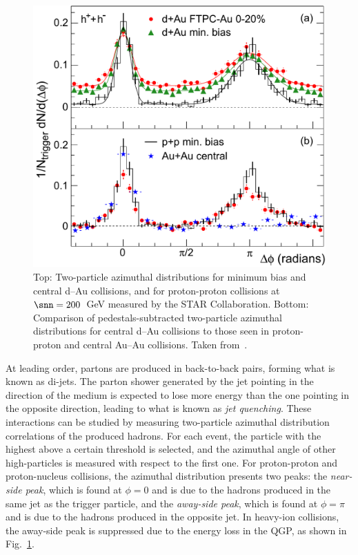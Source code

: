 \begin{figure}[htb]
  \centering
  \includegraphics[width=0.7\linewidth]{Figures/Chapter 1/dAu_Fig4.pdf}
  \caption{Top: Two-particle azimuthal distributions for minimum bias and central d--Au collisions, and for proton-proton collisions at $\snn = 200$~GeV measured by the STAR Collaboration. Bottom: Comparison of pedestals-subtracted two-particle azimuthal distributions for central d--Au collisions to those seen in proton-proton and central Au--Au collisions. Taken from~\cite{STAR:2003pjh}.}
  \label{fig:azimuthal_correlations}
\end{figure}

At leading order, partons are produced in back-to-back pairs, forming what is known as di-jets. The parton shower generated by the jet pointing in the direction of the medium is expected to lose more energy than the one pointing in the opposite direction, leading to what is known as \emph{jet quenching}. These interactions can be studied by measuring two-particle azimuthal distribution correlations of the produced hadrons. For each event, the particle with the highest \pt above a certain threshold is selected, and the azimuthal angle of other high-\pt particles is measured with respect to the first one. For proton-proton and proton-nucleus collisions, the azimuthal distribution presents two peaks: the \emph{near-side peak}, which is found at $\phi=0$ and is due to the hadrons produced in the same jet as the trigger particle, and the \emph{away-side peak}, which is found at $\phi=\pi$ and is due to the hadrons produced in the opposite jet. In heavy-ion collisions, the away-side peak is suppressed due to the energy loss in the QGP, as shown in Fig.~\ref{fig:azimuthal_correlations}.

